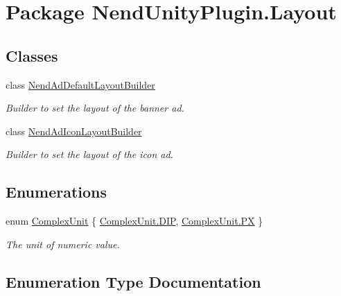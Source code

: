 \hypertarget{namespace_nend_unity_plugin_1_1_layout}{}\section{Package Nend\+Unity\+Plugin.\+Layout}
\label{namespace_nend_unity_plugin_1_1_layout}
\subsection*{Classes}
\begin{DoxyCompactItemize}
\item 
class \hyperlink{class_nend_unity_plugin_1_1_layout_1_1_nend_ad_default_layout_builder}{Nend\+Ad\+Default\+Layout\+Builder}
\begin{DoxyCompactList}\small\item\em Builder to set the layout of the banner ad. \end{DoxyCompactList}\item 
class \hyperlink{class_nend_unity_plugin_1_1_layout_1_1_nend_ad_icon_layout_builder}{Nend\+Ad\+Icon\+Layout\+Builder}
\begin{DoxyCompactList}\small\item\em Builder to set the layout of the icon ad. \end{DoxyCompactList}\end{DoxyCompactItemize}
\subsection*{Enumerations}
\begin{DoxyCompactItemize}
\item 
enum \hyperlink{namespace_nend_unity_plugin_1_1_layout_a506052e088d9ad5e6fd3095641e044d3}{Complex\+Unit} \{ \hyperlink{namespace_nend_unity_plugin_1_1_layout_a506052e088d9ad5e6fd3095641e044d3ab941a28ed6d936315cc87c8a5e15b1d6}{Complex\+Unit.\+D\+I\+P}, 
\hyperlink{namespace_nend_unity_plugin_1_1_layout_a506052e088d9ad5e6fd3095641e044d3a87e6c078833a3c35b65067a50c936b37}{Complex\+Unit.\+P\+X}
 \}
\begin{DoxyCompactList}\small\item\em The unit of numeric value. \end{DoxyCompactList}\end{DoxyCompactItemize}


\subsection{Enumeration Type Documentation}
\hypertarget{namespace_nend_unity_plugin_1_1_layout_a506052e088d9ad5e6fd3095641e044d3}{}
